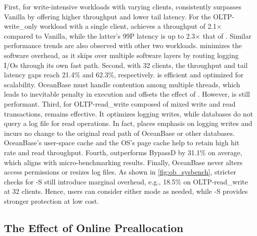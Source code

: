 First, for write-intensive workloads with varying clients, \odes consistently surpasses Vanilla by offering higher throughput and lower tail latency. For the OLTP-write\_only workload with a single client, \odes achieves a throughput of  {2.1$\times$} compared to   
Vanilla, while the latter's 99P latency is up to {2.3$\times$} that of \odes. Similar performance trends are also observed with   other two workloads. 
\odes  minimizes the software overhead, as it
 skips over multiple software layers by routing logging I/Os through its own fast path.
Second, with 32 clients, the throughput and tail latency gaps reach 21.4\% and 62.3\%, respectively. 
\odes is  efficient and optimized for scalability.
  OceanBase must handle contention among multiple threads, which leads to 
inevitable penalty in execution and offsets the effect of \odes. However, \odes is still performant.
Third, for OLTP-read\_write composed of mixed write and read transactions, \odes remains effective.  It  optimizes logging writes, 
while databases do not query a log file for read operations. In fact,
\odes places emphasis on logging writes and incurs no change to the original read path of OceanBase or other databases.  OceanBase's  user-space cache and the OS's page cache
help to retain high   hit rate and read throughput. 
Fourth, \odes outperforms BypassD by 31.1\% on average, which aligns with micro-benchmarking results. 
Finally, %
OceanBase  never alters  access permissions or resizes log files. As shown in \autoref{fig:ob_sysbench}, stricter   checks for \odes-S still introduce  marginal overhead, e.g.,  18.5\% on OLTP-read\_write at 32 clients. 
Hence, users can consider either mode as needed, while \odes-S provides stronger protection at low cost.



\subsection{The Effect of Online Preallocation}\label{sec:eval:preallocation}

